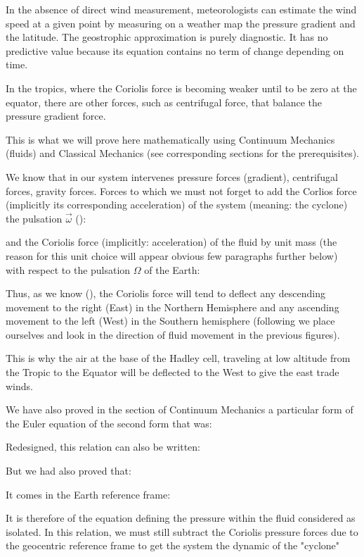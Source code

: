 	In the absence of direct wind measurement, meteorologists can estimate the wind speed at a given point by measuring on a weather map the pressure gradient and the latitude. The geostrophic approximation is purely diagnostic. It has no predictive value because its equation contains no term of change depending on time.
	
	In the tropics, where the Coriolis force is becoming weaker until to be zero at the equator, there are other forces, such as centrifugal force, that balance the pressure gradient force.

	This is what we will prove here mathematically using Continuum Mechanics (fluids) and Classical Mechanics (see corresponding sections for the prerequisites).
	
	We know that in our system intervenes pressure forces (gradient), centrifugal forces, gravity forces. Forces to which we must not forget to add the Corlios force (implicitly its corresponding acceleration) of the system (meaning: the cyclone) the pulsation $\vec{\omega}$ ():
	
	and the Coriolis force (implicitly: acceleration) of the fluid by unit mass (the reason for this unit choice will appear obvious few paragraphs further below) with respect to the pulsation $\Omega$ of the Earth:
	
	Thus, as we know (), the Coriolis force will tend to deflect any descending movement to the right (East) in the Northern Hemisphere and any ascending movement to the left (West) in the Southern hemisphere (following we place ourselves and look in the direction of fluid movement in the previous figures).

	This is why the air at the base of the Hadley cell, traveling at low altitude from the Tropic to the Equator will be deflected to the West to give the east trade winds.

	We have also proved in the section of Continuum Mechanics a particular form of the Euler equation of the second form that was:
	
	Redesigned, this relation can also be written:
	
	But we had also proved that:
	
	It comes in the Earth reference frame:
	
	It is therefore of the equation defining the pressure within the fluid considered as isolated. In this relation, we must still subtract the Coriolis pressure  forces due to the geocentric reference frame to get the system the dynamic of the "cyclone"
	
